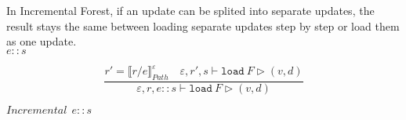 \documentclass[10pt,twoside,a4paper]{article}
\theoremstyle{theorem}
\theoremstyle{lemma}
\theoremstyle{property}
\theoremstyle{definition}
\theoremstyle{assumption}
\begin{document}
\begin{comment}
\begin{displaymath}
	\frac{\begin{array}{c}
		{\delta_\varepsilon}' = (\delta_\varepsilon, x \mapsto (m, \delta_m))\\
		(\delta_\varepsilon, x \mapsto (m, \delta_m)), k \vdash \mathtt{load}_\Delta (F,v,d)~ \delta_F \rhd (\delta_v, \delta_d)
	\end{array}}
	{{\delta_\varepsilon}', k \vdash \mathtt{load}_\Delta (F,v,d)~ \delta_F \rhd (\delta_v, \delta_d)}
\end{displaymath}
\end{comment}

In Incremental Forest, if an update can be splited into separate updates, the result stays the same between loading separate updates step by step or load them as one update.\\

$\boxed{e::s}$

\begin{displaymath}
	\frac{
		r' = \llbracket r/e \rrbracket^\varepsilon_{Path} \quad \varepsilon, r', s \vdash \mathtt{load}~F \rhd(v, d)
	}
	{
		\varepsilon, r, e::s \vdash \mathtt{load}~F \rhd (v,d)
	}
\end{displaymath}

$\boxed{Incremental~~e::s}$
\end{document}
